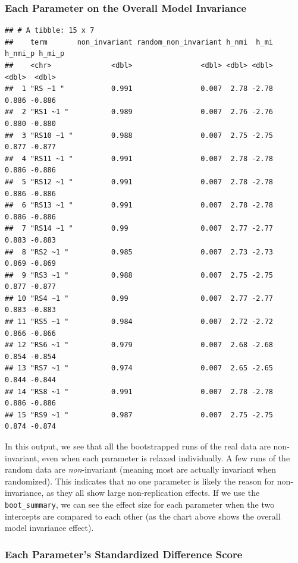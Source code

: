 \documentclass[
  man]{apa7}
\begin{document}
\hypertarget{each-parameter-on-the-overall-model-invariance}{%
\subsubsection{Each Parameter on the Overall Model Invariance}\label{each-parameter-on-the-overall-model-invariance}}

\begin{verbatim}
## # A tibble: 15 x 7
##    term       non_invariant random_non_invariant h_nmi  h_mi h_nmi_p h_mi_p
##    <chr>              <dbl>                <dbl> <dbl> <dbl>   <dbl>  <dbl>
##  1 "RS ~1 "           0.991                0.007  2.78 -2.78   0.886 -0.886
##  2 "RS1 ~1 "          0.989                0.007  2.76 -2.76   0.880 -0.880
##  3 "RS10 ~1 "         0.988                0.007  2.75 -2.75   0.877 -0.877
##  4 "RS11 ~1 "         0.991                0.007  2.78 -2.78   0.886 -0.886
##  5 "RS12 ~1 "         0.991                0.007  2.78 -2.78   0.886 -0.886
##  6 "RS13 ~1 "         0.991                0.007  2.78 -2.78   0.886 -0.886
##  7 "RS14 ~1 "         0.99                 0.007  2.77 -2.77   0.883 -0.883
##  8 "RS2 ~1 "          0.985                0.007  2.73 -2.73   0.869 -0.869
##  9 "RS3 ~1 "          0.988                0.007  2.75 -2.75   0.877 -0.877
## 10 "RS4 ~1 "          0.99                 0.007  2.77 -2.77   0.883 -0.883
## 11 "RS5 ~1 "          0.984                0.007  2.72 -2.72   0.866 -0.866
## 12 "RS6 ~1 "          0.979                0.007  2.68 -2.68   0.854 -0.854
## 13 "RS7 ~1 "          0.974                0.007  2.65 -2.65   0.844 -0.844
## 14 "RS8 ~1 "          0.991                0.007  2.78 -2.78   0.886 -0.886
## 15 "RS9 ~1 "          0.987                0.007  2.75 -2.75   0.874 -0.874
\end{verbatim}

In this output, we see that all the bootstrapped runs of the real data are non-invariant, even when each parameter is relaxed individually. A few runs of the random data are \emph{non}-invariant (meaning most are actually invariant when randomized). This indicates that no one parameter is likely the reason for non-invariance, as they all show large non-replication effects. If we use the \texttt{boot\_summary}, we can see the effect size for each parameter when the two intercepts are compared to each other (as the chart above shows the overall model invariance effect).

\hypertarget{each-parameters-standardized-difference-score}{%
\subsubsection{Each Parameter's Standardized Difference Score}\label{each-parameters-standardized-difference-score}}
\end{document}
